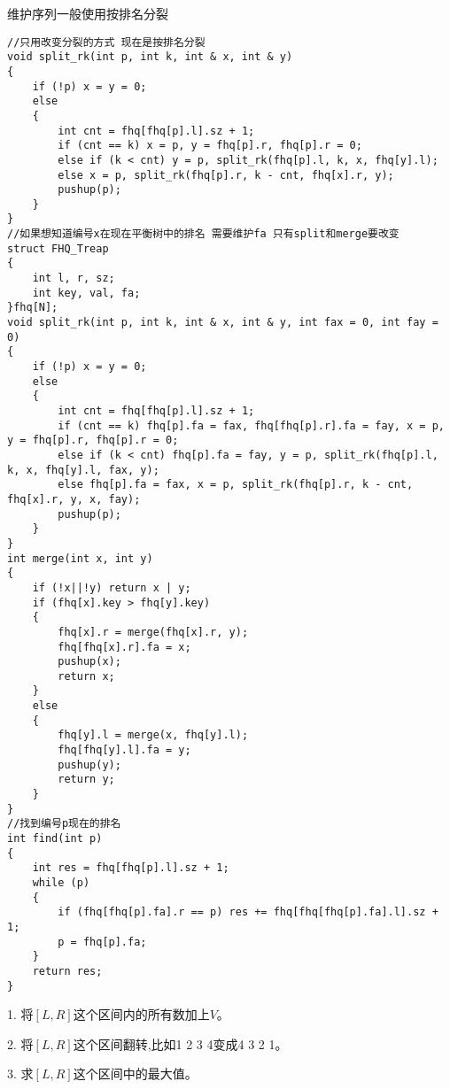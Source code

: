 \documentclass[a4paper,fontset=none]{ctexart}
\begin{document}
维护序列一般使用按排名分裂

\begin{verbatim}
//只用改变分裂的方式 现在是按排名分裂
void split_rk(int p, int k, int & x, int & y)
{
    if (!p) x = y = 0;
    else
    {
        int cnt = fhq[fhq[p].l].sz + 1;
        if (cnt == k) x = p, y = fhq[p].r, fhq[p].r = 0;
        else if (k < cnt) y = p, split_rk(fhq[p].l, k, x, fhq[y].l);
        else x = p, split_rk(fhq[p].r, k - cnt, fhq[x].r, y);
        pushup(p);
    }
}
//如果想知道编号x在现在平衡树中的排名 需要维护fa 只有split和merge要改变
struct FHQ_Treap
{
    int l, r, sz;
    int key, val, fa;
}fhq[N];
void split_rk(int p, int k, int & x, int & y, int fax = 0, int fay = 0)
{
    if (!p) x = y = 0;
    else
    {
        int cnt = fhq[fhq[p].l].sz + 1;
        if (cnt == k) fhq[p].fa = fax, fhq[fhq[p].r].fa = fay, x = p, y = fhq[p].r, fhq[p].r = 0;
        else if (k < cnt) fhq[p].fa = fay, y = p, split_rk(fhq[p].l, k, x, fhq[y].l, fax, y);
        else fhq[p].fa = fax, x = p, split_rk(fhq[p].r, k - cnt, fhq[x].r, y, x, fay);
        pushup(p);
    }
}
int merge(int x, int y)
{
    if (!x||!y) return x | y;
    if (fhq[x].key > fhq[y].key)
    {
        fhq[x].r = merge(fhq[x].r, y);
        fhq[fhq[x].r].fa = x;
        pushup(x);
        return x;
    }
    else
    {
        fhq[y].l = merge(x, fhq[y].l);
        fhq[fhq[y].l].fa = y;
        pushup(y);
        return y;
    }
}
//找到编号p现在的排名
int find(int p)
{
    int res = fhq[fhq[p].l].sz + 1;
    while (p)
    {
        if (fhq[fhq[p].fa].r == p) res += fhq[fhq[fhq[p].fa].l].sz + 1;
        p = fhq[p].fa;
    }
    return res;
}
\end{verbatim}

1. 将$[L,R]$这个区间内的所有数加上$V$。

2. 将$[L,R]$这个区间翻转,比如1 2 3 4变成4 3 2 1。

3. 求$[L,R]$这个区间中的最大值。
\end{document}
